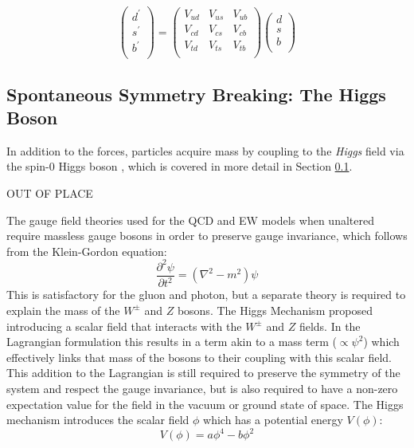 		\begin{equation}
		\begin{pmatrix}
		d^\prime \\
		s^\prime\\
		b^\prime \\
		\end{pmatrix}
		 = \begin{pmatrix}
		V_{ud} & V_{us} & V_{ub} \\
		V_{cd} & V_{cs} & V_{cb} \\
		V_{td} & V_{ts} & V_{tb} \\
		\end{pmatrix}
	    \begin{pmatrix}
	    d \\
	    s\\
	    b \\
	    \end{pmatrix}
		\end{equation}



	\subsection{Spontaneous Symmetry Breaking: The Higgs Boson}
	\label{t:symbreak}


	In addition to the forces, particles acquire mass by coupling to the \textit{Higgs} field via the spin-$0$ Higgs boson \cite{gauge-boson-mass, higgs-1, higgs-2}, which is covered in more detail in Section \ref{t:symbreak}.

	OUT OF PLACE

	The gauge field theories used for the QCD and EW models when unaltered require massless gauge bosons in order to preserve gauge invariance, which follows from the Klein-Gordon equation:
	\begin{equation}
		\frac{\partial^2\psi}{\partial t^2} = (\nabla^2 - m^2)\psi
	\end{equation}
	 This is satisfactory for the gluon and photon, but a separate theory is required to explain the mass of the $W^\pm$ and $Z$ bosons. The Higgs Mechanism proposed introducing a scalar field that interacts with the $W^\pm$ and $Z$ fields. In the Lagrangian formulation this results in a term akin to a mass term ($\propto\psi^2$) which effectively links that mass of the bosons to their coupling with this scalar field. This addition to the Lagrangian is still required to preserve the symmetry of the system and respect the gauge invariance, but is also required to have a non-zero expectation value for the field in the vacuum or ground state of space. The Higgs mechanism introduces the scalar field $\phi$ which has a potential energy $V(\phi)$:
	 \begin{equation}
		 V(\phi) = a\phi^4 - b\phi^2
	 \end{equation}

